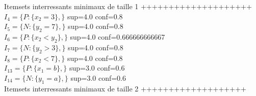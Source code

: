 \documentclass[a4paper,12pt,openany,oneside]{article}
\begin{document}
        Itemsets interressants minimaux de taille 1 ++++++++++++++++++++\\
        
        $I_{4}=\{P:\{x_{2}=3\},\}$  sup=4.0 conf=0.8\\
        $I_{5}=\{N:\{y_{2}=7\},\}$  sup=4.0 conf=0.8\\
        $I_{6}=\{P:\{x_{2}<y_{2}\},\}$  sup=4.0 conf=0.666666666667\\
        $I_{7}=\{N:\{y_{2}>3\},\}$  sup=4.0 conf=0.8\\
        $I_{8}=\{P:\{x_{2}<7\},\}$  sup=4.0 conf=0.8\\
        $I_{13}=\{P:\{x_{1}=b\},\}$  sup=3.0 conf=0.6\\
        $I_{14}=\{N:\{y_{1}=a\},\}$  sup=3.0 conf=0.6\\
        
        Itemsets interressants minimaux de taille 2 +++++++++++++++++++\\
        
\end{document}
